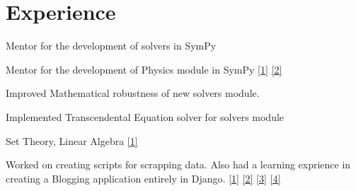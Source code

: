 \documentclass[]{deedy-resume-openfont}
\begin{document}
\hfill
\begin{minipage}[t]{0.66\textwidth} 


\section{Experience}

\vspace{\topsep} %
\begin{tightemize}
\item Mentor for the development of solvers in SymPy
\item Mentor for the development of Physics module in SymPy
\href{https://summerofcode.withgoogle.com/archive/2019/projects/5351176374059008/}{[1]}
\href{https://summerofcode.withgoogle.com/archive/2019/projects/4722757948932096/}{[2]}
\end{tightemize}
\sectionsep

\vspace{\topsep} %
\begin{tightemize}
\item Improved Mathematical robustness of new solvers module.
\item Implemented Transcendental Equation solver for solvers module
\item Set Theory, Linear Algebra
\href{https://summerofcode.withgoogle.com/archive/2018/projects/6261947964063744/}{[1]}
\end{tightemize}
\sectionsep

\begin{tightemize}
\item Worked on creating scripts for scrapping data. Also had a learning exprience in creating a Blogging application entirely
in Django.
\href{https://github.com/Yathartha22/farcon_image_scrapper}{[1]}
\href{https://github.com/Yathartha22/quotesBot}{[2]}
\href{https://github.com/Yathartha22/nasa}{[3]}
\href{https://github.com/Yathartha22/myblog}{[4]}
\end{tightemize}
\sectionsep




\end{minipage}
\end{document}
